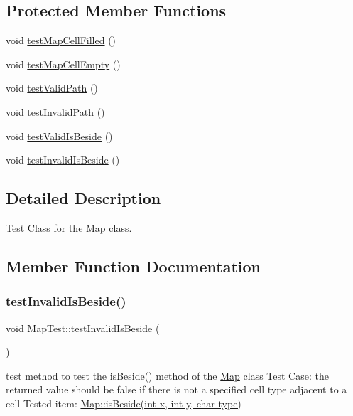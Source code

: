 \subsection*{Protected Member Functions}
\begin{DoxyCompactItemize}
\item 
void \hyperlink{classMapTest_a07e1aa96435351d15809b880ff7a7efb}{test\+Map\+Cell\+Filled} ()
\item 
void \hyperlink{classMapTest_a83bb3473f74089996c7f6bee8d59a97c}{test\+Map\+Cell\+Empty} ()
\item 
void \hyperlink{classMapTest_ae7a28d196c97101aa248a326af2a3f5b}{test\+Valid\+Path} ()
\item 
void \hyperlink{classMapTest_ad8823027d386c8d25f378d02adad120d}{test\+Invalid\+Path} ()
\item 
void \hyperlink{classMapTest_a272b34d1f908c9105f631512aa395165}{test\+Valid\+Is\+Beside} ()
\item 
void \hyperlink{classMapTest_ad70182f72d4f066cd9bb20fc069426d9}{test\+Invalid\+Is\+Beside} ()
\end{DoxyCompactItemize}


\subsection{Detailed Description}
Test Class for the \hyperlink{classMap}{Map} class. 

\subsection{Member Function Documentation}
\hypertarget{classMapTest_ad70182f72d4f066cd9bb20fc069426d9}{}\label{classMapTest_ad70182f72d4f066cd9bb20fc069426d9} 
\subsubsection{\texorpdfstring{test\+Invalid\+Is\+Beside()}{testInvalidIsBeside()}}
{\footnotesize\ttfamily void Map\+Test\+::test\+Invalid\+Is\+Beside (\begin{DoxyParamCaption}{ }\end{DoxyParamCaption})\hspace{0.3cm}{\ttfamily [protected]}}

test method to test the is\+Beside() method of the \hyperlink{classMap}{Map} class Test Case\+: the returned value should be false if there is not a specified cell type adjacent to a cell Tested item\+: \hyperlink{classMap_a7ba2837b589493924b726dc326d68e8e}{Map\+::is\+Beside(int x, int y, char type)} \hypertarget{classMapTest_ad8823027d386c8d25f378d02adad120d}{}\label{classMapTest_ad8823027d386c8d25f378d02adad120d} 
